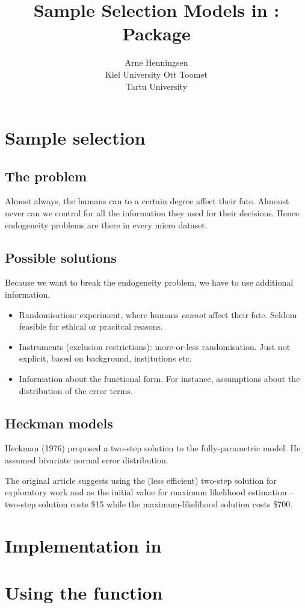 \documentclass[article]{jss}
\author{Arne Henningsen\\Kiel University
  \And
  Ott Toomet\\Tartu University}
\title{Sample Selection Models in \proglang{R}:\\
  Package \pkg{micEcon}}
\begin{document}


\section{Sample selection}


\subsection{The problem}

Almost always, the humans can to a certain degree affect their fate.
Almoust never can we control for all the information they used for
their decisions.  Hence endogeneity problems are there in every micro
dataset.


\subsection{Possible solutions}

Because we want to break the endogeneity problem, we have to use
additional information.

\begin{itemize}
\item Randomisation: experiment, where humans \emph{cannot} affect
  their fate.  Seldom feasible for ethical or pracitcal reasons.
\item Instruments (exclusion restrictions): more-or-less
  randomisation.  Just not explicit, based on background, institutions
  etc.
\item Information about the functional form.  For instance,
  assumptions about the distribution of the error terms.
\end{itemize}


\subsection{Heckman models}

Heckman (1976) proposed a two-step solution to the fully-parametric
model.  He assumed bivariate normal error distribution.

The original article suggests using the (less efficient) two-step
solution for exploratory work and as the initial value for maximum
likelihood estimation -- two-step solution costs \$15 while the
maximum-likelihood solution costs \$700.



\section[Implementation]{Implementation in }



\section[Usage]{Using the  function}



\end{document}
